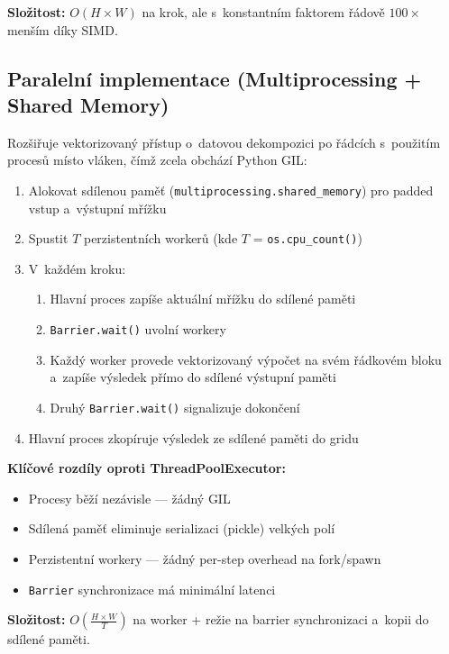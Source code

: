 \documentclass[12pt,a4paper]{article}
\begin{document}
\noindent\textbf{Složitost:} $O(H \times W)$ na krok, ale s~konstantním faktorem řádově $100\times$ menším díky SIMD.

\subsection{Paralelní implementace (Multiprocessing + Shared Memory)}

Rozšiřuje vektorizovaný přístup o~datovou dekompozici po řádcích s~použitím procesů místo vláken, čímž zcela obchází Python GIL:

\begin{enumerate}
    \item Alokovat sdílenou paměť (\texttt{multiprocessing.shared\_memory}) pro padded vstup a~výstupní mřížku
    \item Spustit $T$ perzistentních workerů (kde $T$ = \texttt{os.cpu\_count()})
    \item V~každém kroku:
    \begin{enumerate}
        \item Hlavní proces zapíše aktuální mřížku do sdílené paměti
        \item \texttt{Barrier.wait()} uvolní workery
        \item Každý worker provede vektorizovaný výpočet na svém řádkovém bloku a~zapíše výsledek přímo do sdílené výstupní paměti
        \item Druhý \texttt{Barrier.wait()} signalizuje dokončení
    \end{enumerate}
    \item Hlavní proces zkopíruje výsledek ze sdílené paměti do gridu
\end{enumerate}

\noindent\textbf{Klíčové rozdíly oproti ThreadPoolExecutor:}
\begin{itemize}
    \item Procesy běží nezávisle --- žádný GIL
    \item Sdílená paměť eliminuje serializaci (pickle) velkých polí
    \item Perzistentní workery --- žádný per-step overhead na fork/spawn
    \item \texttt{Barrier} synchronizace má minimální latenci
\end{itemize}

\noindent\textbf{Složitost:} $O\!\left(\frac{H \times W}{T}\right)$ na worker + režie na barrier synchronizaci a~kopii do sdílené paměti.
\end{document}
